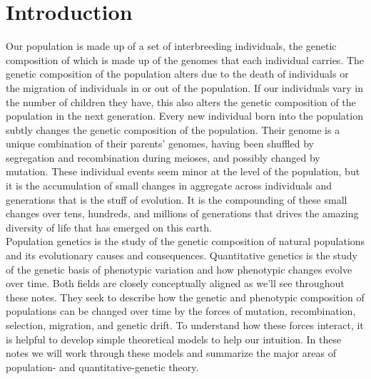 \chapter{Introduction}
\cite{DobzhanskyBook} Our population is made up of a set of interbreeding individuals, the genetic composition of which is made up of the  genomes that each individual carries.  %
The genetic composition of the population alters due to the death of individuals or the migration of individuals in or out
of the population. If our individuals vary in the number of children they have, this
also alters the genetic composition of the population in the next generation.
Every new individual born into the population subtly changes the genetic
composition of the population. Their genome is a unique combination of their
parents' genomes, having been shuffled by segregation and recombination during
meioses, and possibly changed by mutation. These individual events seem minor at the level of the population, but it is the accumulation of small changes in aggregate across individuals and generations that is the stuff of evolution. It is the compounding of these small changes over tens, hundreds, and millions of generations that drives the amazing diversity of life that has emerged on this earth.\\

Population genetics is the study of the genetic composition of natural
populations and its evolutionary causes and consequences. Quantitative genetics is the study of the genetic basis of phenotypic variation and how phenotypic changes evolve over time. Both fields are closely conceptually aligned as we'll see throughout these notes. They seek to describe how the genetic and phenotypic composition of populations can be changed over
time by the forces of mutation, recombination, selection, migration, and
genetic drift.  To understand how these forces interact, it is helpful to
develop simple theoretical models to help our intuition. In these notes we will
work through these models and summarize the major areas of population- and quantitative-genetic
theory.\\


